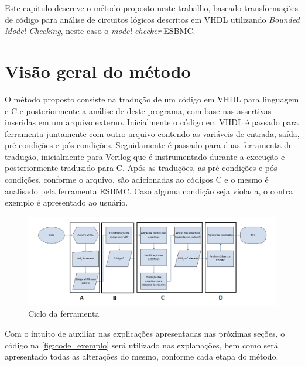 \label{chapter:metodo}
\par
Este capítulo descreve o método proposto neste trabalho, baseado transformações de código para análise de circuitos lógicos descritos em VHDL utilizando 
\textit{Bounded Model Checking}, neste caso o \textit{model checker} ESBMC.

\section{Visão geral do método}

\par
O método proposto consiste na tradução de um código em VHDL para linguagem e C e posteriormente a análise de deste programa, com base nas assertivas inseridas em um arquivo externo.  Inicialmente o código em VHDL é passado para ferramenta juntamente com outro arquivo contendo as variáveis de entrada, saída, pré-condições e pós-condições. Seguidamente é passado para duas ferramenta de tradução, inicialmente para Verilog que é instrumentado durante a execução e posteriormente traduzido para C. Após as traduções, as pré-condições e pós-condições, conforme o arquivo, são adicionadas ao códigos C e o mesmo é analisado pela ferramenta ESBMC. Caso alguma condição seja violada, o contra exemplo é apresentado ao usuário.

\begin{figure}[H]
	\begin{center}
    \caption{\label{fig:Fluxo_ferramenta}Ciclo da ferramenta}
	\includegraphics[scale=0.55]{Figuras/Fluxo_ferramenta.png}
	\end{center}
\end{figure}

\par
Com o intuito de auxiliar nas explicações apresentadas nas próximas seções, o código na \autoref{fig:code_exemplo} será utilizado nas explanações, bem como será apresentado todas as alterações do mesmo, conforme cada etapa do método.  

